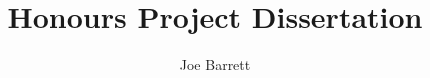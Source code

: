 \documentclass[a4paper, 12pt]{article}
\title{Honours Project Dissertation}
\author{Joe Barrett}
\begin{document}
	
	\begin{abstract}
		\blindtext
	\end{abstract}
	
	\blindtext
	
\end{document}
